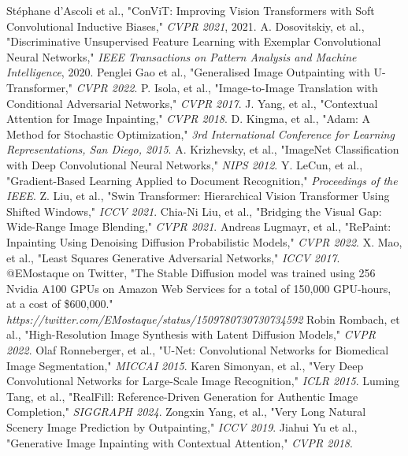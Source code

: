 \documentclass[sigconf]{acmart}
\begin{document}
\begin{thebibliography}{9}
     Stéphane d’Ascoli et al., "ConViT: Improving Vision Transformers with Soft Convolutional Inductive Biases," \textit{CVPR 2021}, 2021.
     A. Dosovitskiy, et al., "Discriminative Unsupervised Feature Learning with Exemplar Convolutional Neural Networks," \textit{IEEE Transactions on Pattern Analysis and Machine Intelligence}, 2020.
     Penglei Gao et al., "Generalised Image Outpainting with U-Transformer," \textit{CVPR 2022}.
     P. Isola, et al., "Image-to-Image Translation with Conditional Adversarial Networks," \textit{CVPR 2017}.
     J. Yang, et al., "Contextual Attention for Image Inpainting," \textit{CVPR 2018}.
     D. Kingma, et al., "Adam: A Method for Stochastic Optimization," \textit{3rd International Conference for Learning Representations, San Diego, 2015}.
     A. Krizhevsky, et al., "ImageNet Classification with Deep Convolutional Neural Networks," \textit{NIPS 2012}.
     Y. LeCun, et al., "Gradient-Based Learning Applied to Document Recognition," \textit{Proceedings of the IEEE}.
     Z. Liu, et al., "Swin Transformer: Hierarchical Vision Transformer Using Shifted Windows," \textit{ICCV 2021}.
     Chia-Ni Liu, et al., "Bridging the Visual Gap: Wide-Range Image Blending," \textit{CVPR 2021}.
     Andreas Lugmayr, et al., "RePaint: Inpainting Using Denoising Diffusion Probabilistic Models," \textit{CVPR 2022}.
     X. Mao, et al., "Least Squares Generative Adversarial Networks," \textit{ICCV 2017}.
     @EMostaque on Twitter, "The Stable Diffusion model was trained using 256 Nvidia A100 GPUs on Amazon Web Services for a total of 150,000 GPU-hours, at a cost of \$600,000." \textit{https://twitter.com/EMostaque/status/1509780730730734592}
     Robin Rombach, et al., "High-Resolution Image Synthesis with Latent Diffusion Models," \textit{CVPR 2022}.
     Olaf Ronneberger, et al., "U-Net: Convolutional Networks for Biomedical Image Segmentation," \textit{MICCAI 2015}.
     Karen Simonyan, et al., "Very Deep Convolutional Networks for Large-Scale Image Recognition," \textit{ICLR 2015}.
     Luming Tang, et al., "RealFill: Reference-Driven Generation for Authentic Image Completion," \textit{SIGGRAPH 2024}.
     Zongxin Yang, et al., "Very Long Natural Scenery Image Prediction by Outpainting," \textit{ICCV 2019}.
     Jiahui Yu et al., "Generative Image Inpainting with Contextual Attention," \textit{CVPR 2018}.
\end{thebibliography}
\end{document}
